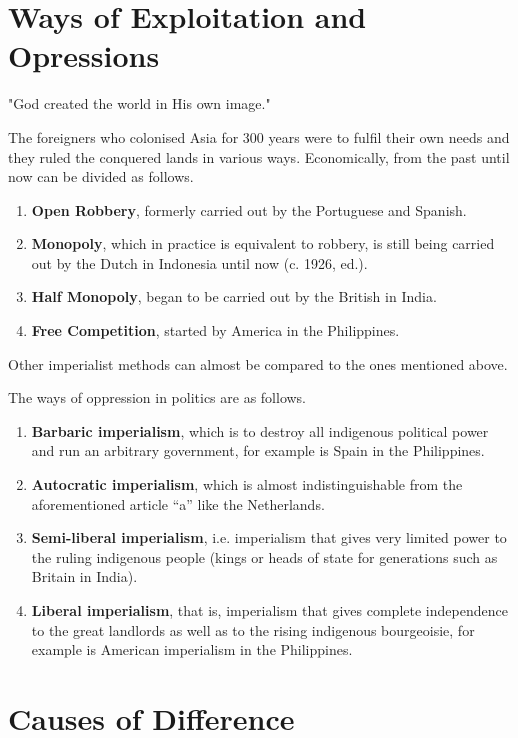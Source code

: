 \section{Ways of Exploitation and Opressions}

"God created the world in His own image."\nline

The foreigners who colonised Asia for 300 years were to fulfil 
their own needs and they ruled the conquered lands in various ways. 
Economically, from the past until now can be divided as follows.\nline

\begin{enumerate}
    \item \textbf{Open Robbery}, formerly carried out by the Portuguese and Spanish.
    \item \textbf{Monopoly}, which in practice is equivalent to robbery, is still being carried out by the Dutch in Indonesia until now (c. 1926, ed.).
    \item \textbf{Half Monopoly}, began to be carried out by the British in India.
    \item \textbf{Free Competition}, started by America in the Philippines.
\end{enumerate}

Other imperialist methods can almost be compared to the ones mentioned above.\nline

The ways of oppression in politics are as follows.

\begin{enumerate}
    \item \textbf{Barbaric imperialism}, which is to destroy all indigenous political power and run an arbitrary government, for example is Spain in the Philippines.
    \item \textbf{Autocratic imperialism}, which is almost indistinguishable from the aforementioned article “a” like the Netherlands.
    \item \textbf{Semi-liberal imperialism}, i.e. imperialism that gives very limited power to the ruling indigenous people (kings or heads of state for generations such as Britain in India).
    \item \textbf{Liberal imperialism}, that is, imperialism that gives complete independence to the great landlords as well as to the rising indigenous bourgeoisie, for example is American imperialism in the Philippines.
\end{enumerate}

\section{Causes of Difference}

